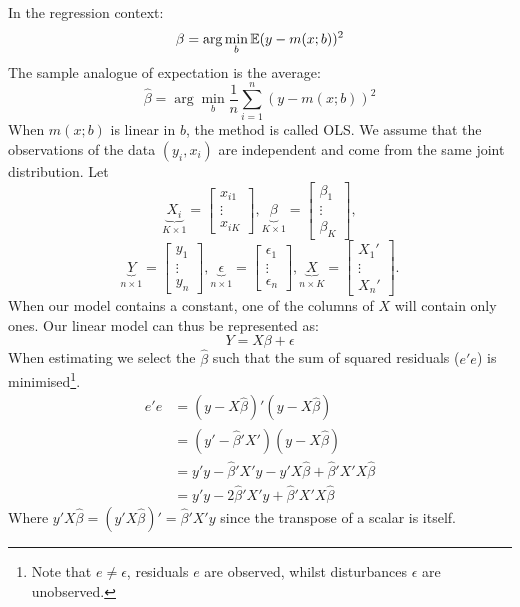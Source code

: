 \documentclass[DIV=14,titlepage=false]{scrreprt}
\begin{document}
In the regression context:
\[ \beta = \arg \min_{b} \mathbb{E} (y-m(x;b))^2\]
The sample analogue of expectation is the average: 
\[ \hat{\beta} = \arg \min_{b} \frac{1}{n}\sum_{i=1}^{n}(y-m(x;b))^2\]
When $m(x;b)$ is linear in $b$, the method is called OLS. We assume that the observations of the data $(y_i,x_i)$ are independent and come from the same joint distribution. Let
$$
\underbrace{X_i}_{K \times 1} = \begin{bmatrix} x_{i1} \\ \vdots \\ x_{iK} \end{bmatrix},
\underbrace{\beta}_{K \times 1} = \begin{bmatrix} \beta_{1} \\ \vdots \\ \beta_{K} \end{bmatrix},
$$
$$
\underbrace{Y}_{n \times 1} = \begin{bmatrix} y_{1} \\ \vdots \\ y_{n} \end{bmatrix},
\underbrace{\epsilon}_{n \times 1} = \begin{bmatrix} \epsilon_{1} \\ \vdots \\ \epsilon_{n} \end{bmatrix},
\underbrace{X}_{n \times K} = \begin{bmatrix} X_{1}' \\ \vdots \\ X_{n}' \end{bmatrix}.
$$
When our model contains a constant, one of the columns of $X$ will contain only ones. Our linear model can thus be represented as: 
\[ Y=X\beta +\epsilon \]
When estimating we select the $\hat\beta$ such that the sum of squared residuals ($e'e$) is minimised\footnote[1]{Note that $e \not = \epsilon$, residuals $e$ are observed, whilst disturbances $\epsilon$ are unobserved.}.
\begin{align*}
    e'e &= (y-X\hat\beta)'(y-X\hat\beta)\\
    &= (y'-\hat\beta'X')(y-X\hat\beta)\\
    &= y'y -\hat\beta'X'y-y'X\hat\beta + \hat\beta'X'X\hat\beta\\
    &= y'y - 2\hat\beta'X'y + \hat\beta'X'X\hat\beta
\end{align*}
Where $y'X\hat\beta = (y'X\hat\beta)'= \hat\beta'X'y$ since the transpose of a scalar is itself. 
\end{document}

